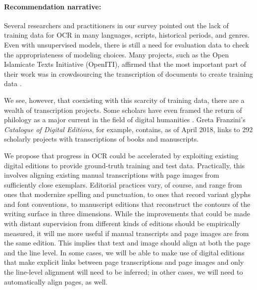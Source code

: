 \documentclass[twoside,11pt]{report}
\begin{document}
\paragraph{Recommendation narrative:}

Several researchers and practitioners in our survey pointed out the lack of training data for OCR in many languages, scripts, historical periods, and genres. Even with unsupervised models, there is still a need for evaluation data to check the appropriateness of modeling choices. Many projects, such as the Open Islamicate Texts Initiative (OpenITI), affirmed that the most important part of their work was in crowdsourcing the transcription of documents to create training data \citep{miller18:_digit_textual_herit_premod_islam_world}.

We see, however, that coexisting with this scarcity of training data, there are a wealth of transcription projects. Some scholars have even framed the return of philology as a major current in the field of digital humanities \citep{mcgann14:_new_repub_letter}. Greta Franzini's \citeyearpar{franzini12:_catal_digit_edition} \emph{Catalogue of Digital Editions}, for example, contains, as of April 2018, links to 292 scholarly projects with transcriptions of books and manuscripts.

We propose that progress in OCR could be accelerated by exploiting existing digital editions to provide ground-truth training and test data. Practically, this involves aligning existing manual transcriptions with page images from sufficiently close exemplars. Editorial practices vary, of course, and range from ones that modernize spelling and punctuation, to ones that record variant glyphs and font conventions, to manuscript editions that reconstruct the contours of the writing surface in three dimensions. While the improvements that could be made with distant supervision from different kinds of editions should be empirically measured, it will me more useful if manual transcripts and page images are from the same edition. This implies that text and image should align at both the page and the line level. In some cases, we will be able to make use of digital editions that make explicit links between page transcriptions and page images and only the line-level alignment will need to be inferred; in other cases, we will need to automatically align pages, as well.
\end{document}
